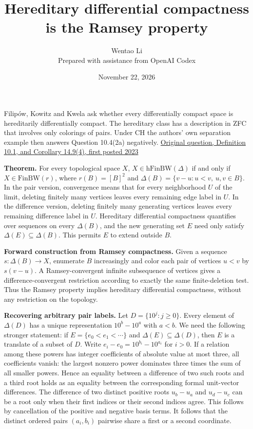 \documentclass[11pt]{article}
\author{Wentao Li\\\small Prepared with assistance from OpenAI Codex}
\date{November 22, 2026}
\title{Hereditary differential compactness is the Ramsey property}
\begin{document}
\maketitle
Filipów, Kowitz and Kwela ask whether every differentially compact space is hereditarily differentially compact. The hereditary class has a description in ZFC that involves only colorings of pairs. Under CH the authors' own separation example then answers Question 10.4(2a) negatively. \href{https://doi.org/10.1017/jsl.2024.8}{Original question, Definition 10.1, and Corollary 14.9(4), first posted 2023}

\textbf{Theorem.} For every topological space \(X\), \(X\in\mathrm{hFinBW}(\Delta)\) if and only if \(X\in\mathrm{FinBW}(r)\), where \(r(B)=[B]^2\) and \(\Delta(B)=\{v-u:u<v,\ u,v\in B\}\). In the pair version, convergence means that for every neighborhood \(U\) of the limit, deleting finitely many vertices leaves every remaining edge label in \(U\). In the difference version, deleting finitely many generating vertices leaves every remaining difference label in \(U\). Hereditary differential compactness quantifies over sequences on every \(\Delta(B)\), and the new generating set \(E\) need only satisfy \(\Delta(E)\subseteq\Delta(B)\). This permits \(E\) to extend outside \(B\).

\textbf{Forward construction from Ramsey compactness.} Given a sequence \(s:\Delta(B)\to X\), enumerate \(B\) increasingly and color each pair of vertices \(u<v\) by \(s(v-u)\). A Ramsey-convergent infinite subsequence of vertices gives a difference-convergent restriction according to exactly the same finite-deletion test. Thus the Ramsey property implies hereditary differential compactness, without any restriction on the topology.

\textbf{Recovering arbitrary pair labels.} Let \(D=\{10^j:j\ge0\}\). Every element of \(\Delta(D)\) has a unique representation \(10^b-10^a\) with \(a<b\). We need the following stronger statement: if \(E=\{e_0<e_1<\cdots\}\) and \(\Delta(E)\subseteq\Delta(D)\), then \(E\) is a translate of a subset of \(D\). Write \(e_i-e_0=10^{b_i}-10^{a_i}\) for \(i>0\). If a relation among these powers has integer coefficients of absolute value at most three, all coefficients vanish: the largest nonzero power dominates three times the sum of all smaller powers. Hence an equality between a difference of two such roots and a third root holds as an equality between the corresponding formal unit-vector differences. The difference of two distinct positive roots \(u_b-u_a\) and \(u_d-u_c\) can be a root only when their first indices or their second indices agree. This follows by cancellation of the positive and negative basis terms. It follows that the distinct ordered pairs \((a_i,b_i)\) pairwise share a first or a second coordinate.
\end{document}

